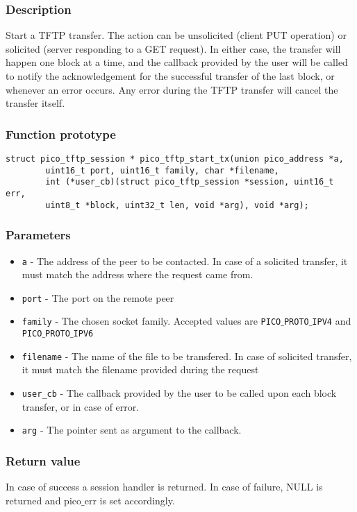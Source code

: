 \subsubsection*{Description}
Start a TFTP transfer. The action can be unsolicited (client PUT operation) or solicited (server responding to a GET request).
In either case, the transfer will happen one block at a time, and the callback provided by the user will be called to notify the acknowledgement for the successful
transfer of the last block, or whenever an error occurs. Any error during the TFTP transfer will cancel the transfer itself.

\subsubsection*{Function prototype}
\begin{verbatim}
struct pico_tftp_session * pico_tftp_start_tx(union pico_address *a,
        uint16_t port, uint16_t family, char *filename,
        int (*user_cb)(struct pico_tftp_session *session, uint16_t err,
        uint8_t *block, uint32_t len, void *arg), void *arg);
\end{verbatim}

\subsubsection*{Parameters}
\begin{itemize}[noitemsep]
\item \texttt{a} - The address of the peer to be contacted. In case of a solicited transfer, it must match the address where the request came from.
\item \texttt{port} - The port on the remote peer
\item \texttt{family} - The chosen socket family. Accepted values are \texttt{PICO$\_$PROTO$\_$IPV4} and \texttt{PICO$\_$PROTO$\_$IPV6}
\item \texttt{filename} - The name of the file to be transfered. In case of solicited transfer, it must match the filename provided during the request
\item \texttt{user\_cb} - The callback provided by the user to be called upon each block transfer, or in case of error.
\item \texttt{arg} - The pointer sent as argument to the callback.
\end{itemize}

\subsubsection*{Return value}
In case of success a session handler is returned. In case of failure, NULL is returned and pico$\_$err is set accordingly.

